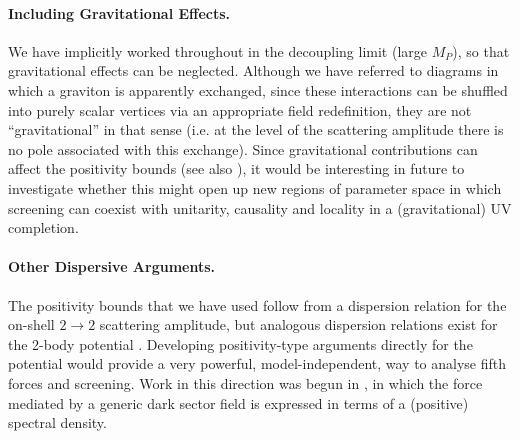 \documentclass[11pt]{article}
\begin{document}


\paragraph{Including Gravitational Effects.}
We have implicitly worked throughout in the decoupling limit (large $M_P$), so that gravitational effects can be neglected.
Although we have referred to diagrams in which a graviton is apparently exchanged, since these interactions can be shuffled into purely scalar vertices via an appropriate field redefinition, they are not ``gravitational'' in that sense (i.e. at the level of the scattering amplitude there is no pole associated with this exchange). 
Since gravitational contributions can affect the positivity bounds \cite{Alberte:2020jsk, Caron-Huot:2021rmr} (see also \cite{Tokuda:2020mlf, Herrero-Valea:2020wxz, Noumi:2021uuv}), it would be interesting in future to investigate whether this might open up new regions of parameter space in which screening can coexist with unitarity, causality and locality in a (gravitational) UV completion.  
 


\paragraph{Other Dispersive Arguments.}
The positivity bounds that we have used follow from a dispersion relation for the on-shell $2\to2$ scattering amplitude, but analogous dispersion relations exist for the 2-body potential \cite{Feinberg:1988yw}. Developing positivity-type arguments directly for the potential would provide a very powerful, model-independent, way to analyse fifth forces and screening. Work in this direction was begun in \cite{Brax:2017xho, Banks:2020gpu}, in which the force mediated by a generic dark sector field is expressed in terms of a (positive) spectral density.  
\end{document}
